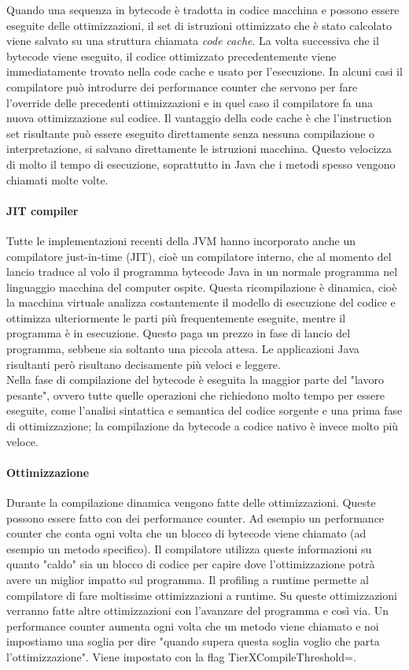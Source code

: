 \documentclass[a4paper, 11pt,            %
openright,               %
italian,
english                 
]{article}       %
\begin{document}
	Quando una sequenza in bytecode è tradotta in codice macchina e possono essere eseguite delle ottimizzazioni, il set di istruzioni ottimizzato che è stato calcolato viene salvato su una struttura chiamata \textit{code cache}. La volta successiva che il bytecode viene eseguito, il codice ottimizzato precedentemente viene immediatamente trovato nella code cache e usato per l'esecuzione. In alcuni casi il compilatore può introdurre dei performance counter che servono per fare l'override delle precedenti ottimizzazioni e in quel caso il compilatore fa una nuova ottimizzazione sul codice. Il vantaggio della code cache è che l'instruction set risultante può essere eseguito direttamente senza nessuna compilazione o interpretazione, si salvano direttamente le istruzioni macchina. Questo velocizza di molto il tempo di esecuzione, soprattutto in Java che i metodi spesso vengono chiamati molte volte.
	
	
	
	
	\paragraph{JIT compiler}
	Tutte le implementazioni recenti della JVM hanno incorporato anche un compilatore just-in-time (JIT), cioè un compilatore interno, che al momento del lancio traduce al volo il programma bytecode Java in un normale programma nel linguaggio macchina del computer ospite. Questa ricompilazione è dinamica, cioè la macchina virtuale analizza costantemente il modello di esecuzione del codice e ottimizza ulteriormente le parti più frequentemente eseguite, mentre il programma è in esecuzione. Questo paga un prezzo in fase di lancio del programma, sebbene sia soltanto una piccola attesa. Le applicazioni Java risultanti però risultano decisamente più veloci e leggere. \\
	Nella fase di compilazione del bytecode è eseguita la maggior parte del "lavoro pesante", ovvero tutte quelle operazioni che richiedono molto tempo per essere eseguite, come l'analisi sintattica e semantica del codice sorgente e una prima fase di ottimizzazione; la compilazione da bytecode a codice nativo è invece molto più veloce.\\
	
	\paragraph{Ottimizzazione }
	Durante la compilazione dinamica vengono fatte delle ottimizzazioni. Queste possono essere fatto con dei performance counter. Ad esempio un performance counter che conta ogni volta che un blocco di bytecode viene chiamato (ad esempio un metodo specifico). Il compilatore utilizza queste informazioni su quanto "caldo" sia un blocco di codice per capire dove l'ottimizzazione potrà avere un miglior impatto sul programma. Il profiling a runtime permette al compilatore di fare moltissime ottimizzazioni a runtime. Su queste ottimizzazioni verranno fatte altre ottimizzazioni con l'avanzare del programma e così via.
	Un performance counter aumenta ogni volta che un metodo viene chiamato e noi impostiamo una soglia per dire "quando supera questa soglia voglio che parta l'ottimizzazione". Viene impostato con la flag TierXCompileThreshold=.
	
\end{document}
